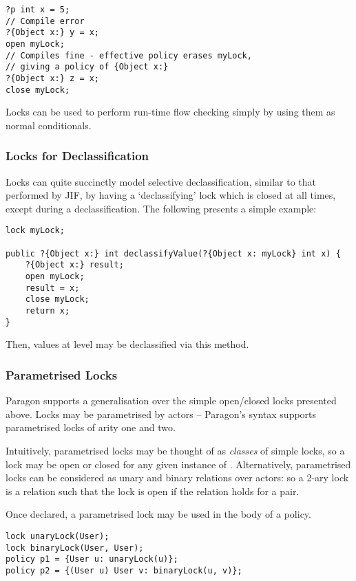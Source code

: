 \begin{verbatim}
?p int x = 5;
// Compile error
?{Object x:} y = x;
open myLock;
// Compiles fine - effective policy erases myLock,
// giving a policy of {Object x:}
?{Object x:} z = x;
close myLock;
\end{verbatim}

Locks can be used to perform run-time flow checking simply by using them as normal conditionals.

\subsubsection{Locks for Declassification}

Locks can quite succinctly model selective declassification, similar to that performed by JIF, by having a `declassifying' lock which is closed at all times, except during a declassification. The following presents a simple example:

\begin{verbatim}
lock myLock;

public ?{Object x:} int declassifyValue(?{Object x: myLock} int x) {
	?{Object x:} result;
	open myLock;
	result = x;
	close myLock;
	return x;
}
\end{verbatim}

Then, values at level  may be declassified via this method.

\subsubsection{Parametrised Locks}

Paragon supports a generalisation over the simple open/closed locks presented above. Locks may be parametrised by actors -- Paragon's syntax supports parametrised locks of arity one and two.

Intuitively, parametrised locks may be thought of as \textit{classes} of simple locks, so a lock  may be open or closed for any given instance of . Alternatively, parametrised locks can be considered as unary and binary relations over actors: so a 2-ary lock  is a relation such that the lock is open if the relation holds for a  pair.

Once declared, a parametrised lock may be used in the body of a policy.

\begin{verbatim}
lock unaryLock(User);
lock binaryLock(User, User);
policy p1 = {User u: unaryLock(u)};
policy p2 = {(User u) User v: binaryLock(u, v)};
\end{verbatim}

